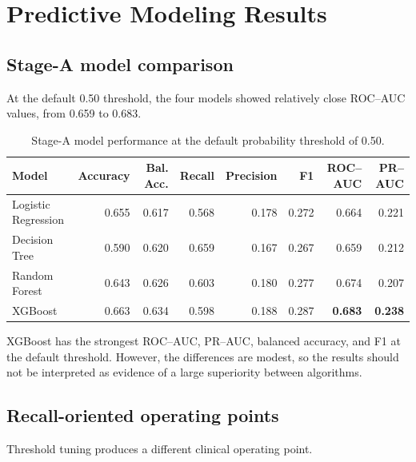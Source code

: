 \documentclass[10pt,a4paper]{article}
\begin{document}
\section{Predictive Modeling Results}

\subsection{Stage-A model comparison}

At the default 0.50 threshold, the four models showed relatively close ROC--AUC values, from 0.659 to 0.683.

\begin{table}[H]
\centering
\small\setlength{\tabcolsep}{3.5pt}
\caption{Stage-A model performance at the default probability threshold of 0.50.}
\label{tab:default}
\begin{tabular}{lrrrrrrr}
\toprule
Model & Accuracy & Bal. Acc. & Recall & Precision & F1 & ROC--AUC & PR--AUC\\
\midrule
Logistic Regression & 0.655 & 0.617 & 0.568 & 0.178 & 0.272 & 0.664 & 0.221\\
Decision Tree & 0.590 & 0.620 & 0.659 & 0.167 & 0.267 & 0.659 & 0.212\\
Random Forest & 0.643 & 0.626 & 0.603 & 0.180 & 0.277 & 0.674 & 0.207\\
XGBoost & 0.663 & 0.634 & 0.598 & 0.188 & 0.287 & \textbf{0.683} & \textbf{0.238}\\
\bottomrule
\end{tabular}
\end{table}

XGBoost has the strongest ROC--AUC, PR--AUC, balanced accuracy, and F1 at the default threshold. However, the differences are modest, so the results should not be interpreted as evidence of a large superiority between algorithms.

\subsection{Recall-oriented operating points}

Threshold tuning produces a different clinical operating point.
\end{document}
